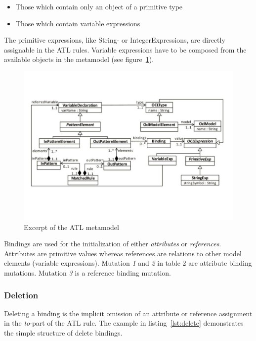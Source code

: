\documentclass{llncs}
\begin{document}
\begin{itemize}
	\item Those which contain only an object of a primitive type
	\item Those which contain variable expressions
\end{itemize}

The primitive expressions, like String- or IntegerExpressions, are directly assignable in the ATL rules. Variable expressions have to be composed from the available objects in the metamodel (see figure~\ref{fig:atl_metamodel_excerpt}).

\begin{figure}
	\centering
	\includegraphics[angle=270,width=1\textwidth,natwidth=610,natheight=642]{figures/ATL_Metamodel_Excerpt}
	\caption{Excerpt of the ATL metamodel}
	\label{fig:atl_metamodel_excerpt}
\end{figure}

Bindings are used for the initialization of either \emph{attributes} or \emph{references}. Attributes are primitive values whereas references are relations to other model elements (variable expressions). Mutation \emph{1} and \emph{2} in table 2 are attribute binding mutations. Mutation \emph{3} is a reference binding mutation.

\subsubsection{Deletion}

Deleting a binding is the implicit omission of an attribute or reference assignment in the \emph{to}-part of the ATL rule. The example in listing~\ref{lst:delete} demonstrates the simple structure of delete bindings.
\end{document}
